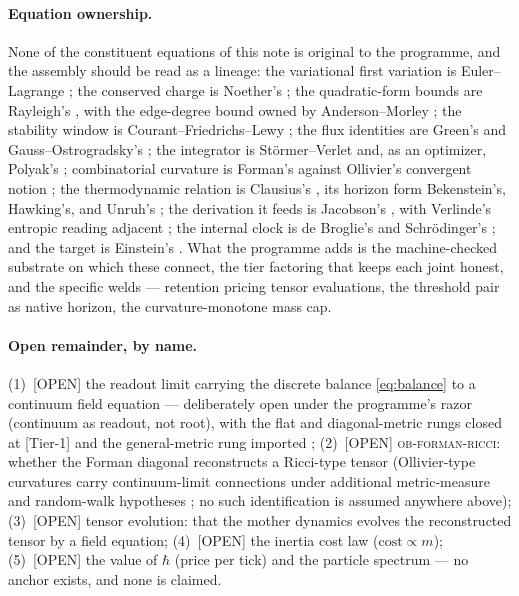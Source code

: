\documentclass[10pt,twocolumn]{article}
\theoremstyle{definition}
\newcommand{\Tone}{\textsf{[Tier-1]}}
\newcommand{\Open}{\textsf{[OPEN]}}
\begin{document}
\paragraph{Equation ownership.} None of the constituent equations of this note is
original to the programme, and the assembly should be read as a lineage: the
variational first variation is Euler--Lagrange \cite{lagrange}; the conserved charge
is Noether's \cite{noether}; the quadratic-form bounds are Rayleigh's
\cite{rayleigh}, with the edge-degree bound owned by Anderson--Morley
\cite{andersonmorley}; the stability window is Courant--Friedrichs--Lewy \cite{cfl};
the flux identities are Green's and Gauss--Ostrogradsky's \cite{green,ostrogradsky}; the integrator is
St\"ormer--Verlet \cite{stormer,verlet} and, as an optimizer, Polyak's \cite{polyak};
combinatorial curvature is Forman's \cite{forman} against Ollivier's convergent
notion \cite{ollivier}; the thermodynamic relation is Clausius's \cite{clausius},
its horizon form Bekenstein's, Hawking's, and Unruh's
\cite{bekenstein,hawking,unruh}; the derivation it feeds is Jacobson's
\cite{jacobson}, with Verlinde's entropic reading adjacent \cite{verlinde}; the
internal clock is de Broglie's and Schr\"odinger's \cite{debroglie,schrodinger};
and the target is Einstein's \cite{einstein1905,einstein1915}. What the programme
adds is the machine-checked substrate on which these connect, the tier factoring
that keeps each joint honest, and the specific welds --- retention pricing tensor
evaluations, the threshold pair as native horizon, the curvature-monotone mass cap.

\paragraph{Open remainder, by name.}
(1)~\Open{} the readout limit carrying the discrete balance \eqref{eq:balance} to a
continuum field equation --- deliberately open under the programme's razor
(continuum as readout, not root), with the flat and diagonal-metric rungs closed at
\Tone{} and the general-metric rung imported \cite{bik};
(2)~\Open{} \textsc{ob-forman-ricci}: whether the Forman diagonal reconstructs a
Ricci-type tensor (Ollivier-type curvatures carry continuum-limit connections under additional
metric-measure and random-walk hypotheses \cite{ollivier,linluyau}; no such
identification is assumed anywhere above);
(3)~\Open{} tensor evolution: that the mother dynamics evolves the reconstructed
tensor by a field equation;
(4)~\Open{} the inertia cost law ($\text{cost}\propto m$);
(5)~\Open{} the value of $\hbar$ (price per tick) and the particle spectrum ---
no anchor exists, and none is claimed.
\end{document}
